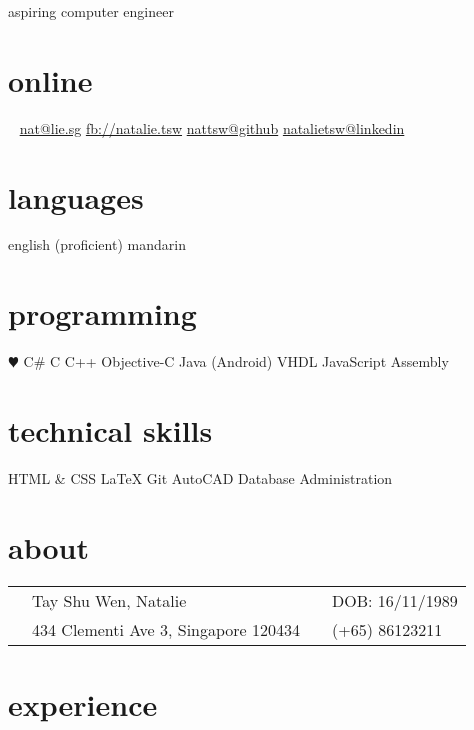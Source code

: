\documentclass[]{friggeri-cv}
\begin{document}
{aspiring computer engineer}
\begin{aside}
	\section{online}
	\Email~ \href{mailto:nat@lie.sg}{nat@lie.sg}
	\href{https://www.facebook.com/natalie.tsw}{fb://natalie.tsw}
	\href{http://github.com/nattsw}{nattsw@github}
	\href{http://sg.linkedin.com/in/natalietsw}{natalietsw@linkedin}
	\section{languages}
	english (proficient)
	mandarin
	\section{programming}
	{\color{red} $\varheartsuit$} C\#
	C
	C++
	Objective-C
	Java (Android)
	VHDL
	JavaScript
	Assembly 	
	\section{technical skills}
	HTML \& CSS
	\LaTeX
	Git
	AutoCAD	
	Database Administration
\end{aside}
\section{about}
\begin{tabular}{ p{0.45cm} p{6.5cm} p{0.45cm} p{6.5cm} }
	\Female 	& Tay Shu Wen, Natalie	 & \Scorpio &  DOB: 16/11/1989\\
	\Letter & 434 Clementi Ave 3, Singapore 120434 & \Mobilefone & (+65) 86123211 \\
\end{tabular}

\section{experience}
\end{document}
